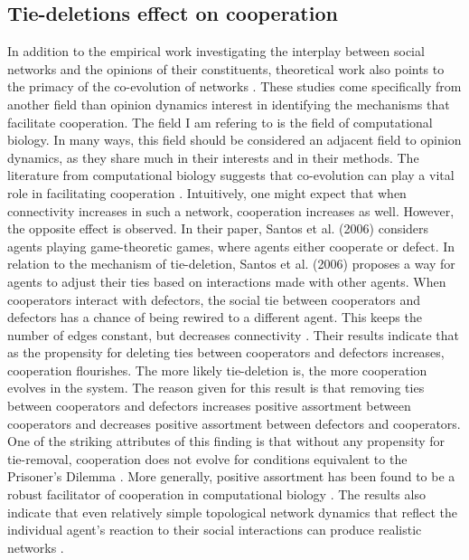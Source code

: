 \documentclass{article}
\begin{document}
\subsection{Tie-deletions effect on cooperation}
In addition to the empirical work investigating the interplay between social networks and the opinions of their constituents, theoretical work also points to the primacy of the co-evolution of networks \cite{holme_nonequilibrium_2006}. 
These studies come specifically from another field than opinion dynamics interest in identifying the mechanisms that facilitate cooperation. The field I am refering to is the field of computational biology. In many ways, this field should be considered an adjacent field to opinion dynamics, as they share much in their interests and in their methods. The literature from computational biology suggests that co-evolution can play a vital role in facilitating cooperation \cite{dakin_dynamic_2018,melamed_strong_2016,pepper_mechanism_2002,santos_cooperation_2006}. 
Intuitively, one might expect that when connectivity increases in such a network, cooperation increases as well. However, the opposite effect is observed. In their paper, Santos et al. (2006) considers agents playing game-theoretic games, where agents either cooperate or defect. 
In relation to the mechanism of tie-deletion, Santos et al. (2006) proposes a way for agents to adjust their ties based on interactions made with other agents. When cooperators interact with defectors, the social tie between cooperators and defectors has a chance of being rewired to a different agent. This keeps the number of edges constant, but decreases connectivity \cite{santos_cooperation_2006}. Their results indicate that as the propensity for deleting ties between cooperators and defectors increases, cooperation flourishes. The more likely tie-deletion is, the more cooperation evolves in the system. The reason given for this result is that removing ties between cooperators and defectors increases positive assortment between cooperators and decreases positive assortment between defectors and cooperators. One of the striking attributes of this finding is that without any propensity for tie-removal, cooperation does not evolve for conditions equivalent to the Prisoner’s Dilemma \cite{santos_cooperation_2006}. More generally, positive assortment has been found to be a robust facilitator of cooperation in computational biology \cite{boyd_coordinated_2010,dakin_dynamic_2018,melamed_strong_2016,pepper_mechanism_2002}. The results also indicate that even relatively simple topological network dynamics that reflect the individual agent’s reaction to their social interactions can produce realistic networks \cite{santos_cooperation_2006}. 
\end{document}
